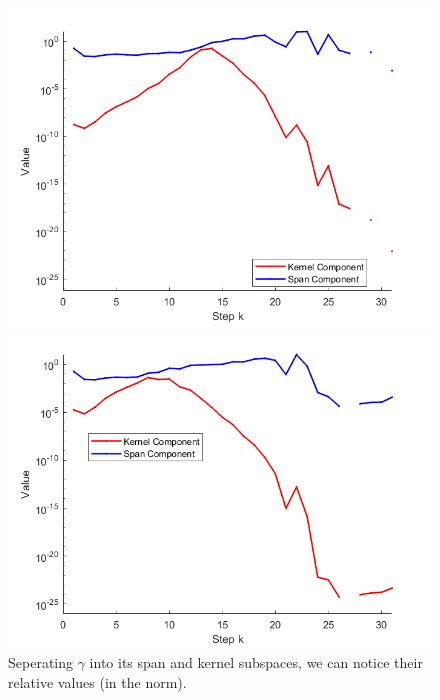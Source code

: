 \begin{figure}[htp]
\begin{minipage}{0.48\textwidth}
        \includegraphics[width=\linewidth]{img/gamma3comp.png}
        \caption{\(\delta = 1e^{-4}\)}
    \end{minipage}
    \hfill
    \begin{minipage}{0.48\textwidth}
        \centering
        \includegraphics[width=\linewidth]{img/gamma4comp.png}
        \caption{\(\delta = 1e^{-2}\)}
    \end{minipage}
    \caption{Seperating \(\gamma\) into its span and kernel subspaces, we can notice their relative values (in the norm).}
    \label{fig:fig4}
\end{figure}